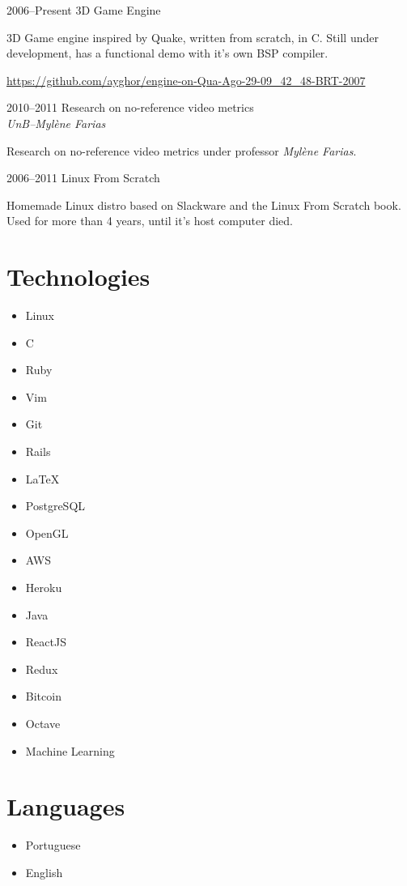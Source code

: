 \documentclass[a4paper,twoside]{simplecv}
\begin{document}
\begin{topic}
\item[2006--Present] 3D Game Engine

	3D Game engine inspired by Quake, written from scratch, in C. Still
	under development, has a functional demo with it's own BSP compiler.

	{\scriptsize\url{https://github.com/ayghor/engine-on-Qua-Ago-29-09\_42\_48-BRT-2007}}

\item[2010--2011] Research on no-reference video metrics\\
	{\em\small UnB--Mylène Farias}

	Research on no-reference video metrics under professor \emph{Mylène
	Farias}.

\item[2006--2011] Linux From Scratch

	Homemade Linux distro based on Slackware and the Linux From Scratch
	book. Used for more than 4 years, until it's host computer died.

\end{topic}

\section{Technologies}

\begin{multicols}{4}
	\raggedcolumns
	\begin{itemize}
		\item Linux
		\item C
		\item Ruby
		\item Vim
		\item Git
		\item Rails
		\item \LaTeX{}
		\item PostgreSQL
		\item OpenGL
		\item AWS
		\item Heroku
		\item Java
		\item ReactJS
		\item Redux
		\item Bitcoin
		\item Octave
		\item Machine Learning
	\end{itemize}
\end{multicols}

\section{Languages}

\begin{multicols}{4}
	\raggedcolumns
	\begin{itemize}
		\item Portuguese
		\item English
	\end{itemize}
\end{multicols}

%
\end{document}
